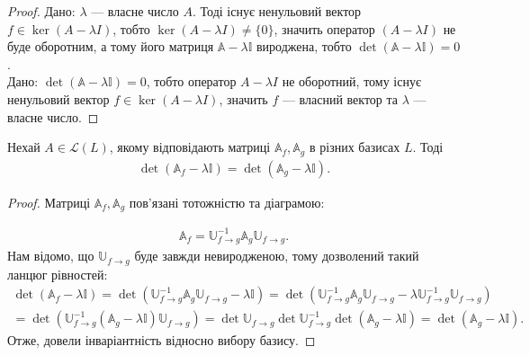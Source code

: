 \documentclass{math_library}
\begin{document}
\begin{proof}
\rightproof Дано: $\lambda$ --- власне число $A$. Тоді існує ненульовий вектор $f \in \ker (A-\lambda I)$, тобто $\ker (A-\lambda I) \neq \{0\}$,  значить оператор $(A-\lambda I)$ не буде оборотним, а тому його матриця $\mathbb{A} - \lambda \mathbb{I}$ вироджена, тобто $\det (\mathbb{A} - \lambda \mathbb{I}) = 0$.
\bigskip \\
\leftproof Дано: $\det(\mathbb{A} - \lambda \mathbb{I}) = 0$, тобто оператор $A-\lambda I$ не оборотний, тому існує ненульовий вектор $f \in \ker (A-\lambda I)$, значить $f$ --- власний вектор та $\lambda$ --- власне число.
\end{proof}

\begin{proposition}
\label{change_of_basis_characteristic_polynomial}
Нехай $A \in \mathcal{L}(L)$, якому відповідають матриці $\mathbb{A}_f, \mathbb{A}_g$ в різних базисах $L$. Тоді
\begin{align*}
\det(\mathbb{A}_f - \lambda \mathbb{I}) = \det(\mathbb{A}_g - \lambda \mathbb{I}).
\end{align*}

\end{proposition}

\begin{proof}
Матриці $\mathbb{A}_f, \mathbb{A}_g$ пов'язані тотожністю та діаграмою:
\begin{center}
\end{center}
\begin{align*}
\mathbb{A}_f = \mathbb{U}^{-1}_{f \to g} \mathbb{A}_g \mathbb{U}_{f \to g}.
\end{align*}
Нам відомо, що $\mathbb{U}_{f \to g}$ буде завжди невиродженою, тому дозволений такий ланцюг рівностей:
\begin{align*}
\det(\mathbb{A}_f - \lambda \mathbb{I}) = \det(\mathbb{U}^{-1}_{f \to g} \mathbb{A}_g \mathbb{U}_{f \to g} - \lambda \mathbb{I}) = \det(\mathbb{U}^{-1}_{f \to g} \mathbb{A}_g \mathbb{U}_{f \to g} - \lambda \mathbb{U}^{-1}_{f \to g} \mathbb{U}_{f \to g}) \\ = \det(\mathbb{U}^{-1}_{f \to g}(\mathbb{A}_g-\lambda \mathbb{I})\mathbb{U}_{f \to g}) = \det \mathbb{U}_{f \to g} \det \mathbb{U}_{f \to g}^{-1} \det (\mathbb{A}_g - \lambda \mathbb{I}) = \det (\mathbb{A}_g - \lambda \mathbb{I}).
\end{align*}
Отже, довели інваріантність відносно вибору базису.
\end{proof}
\end{document}
